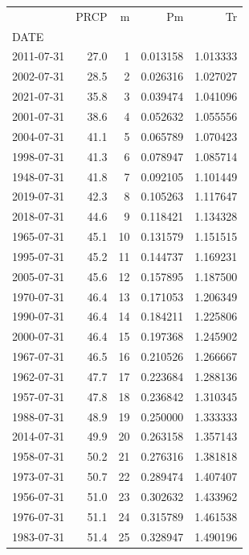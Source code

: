 \documentclass[
  letterpaper,
  DIV=11,
  numbers=noendperiod]{scrreprt}
\begin{document}
\begin{tabular}{lrrrr}
\toprule
{} &   PRCP &   m &        Pm &         Tr \\
DATE       &        &     &           &            \\
\midrule
2011-07-31 &   27.0 &   1 &  0.013158 &   1.013333 \\
2002-07-31 &   28.5 &   2 &  0.026316 &   1.027027 \\
2021-07-31 &   35.8 &   3 &  0.039474 &   1.041096 \\
2001-07-31 &   38.6 &   4 &  0.052632 &   1.055556 \\
2004-07-31 &   41.1 &   5 &  0.065789 &   1.070423 \\
1998-07-31 &   41.3 &   6 &  0.078947 &   1.085714 \\
1948-07-31 &   41.8 &   7 &  0.092105 &   1.101449 \\
2019-07-31 &   42.3 &   8 &  0.105263 &   1.117647 \\
2018-07-31 &   44.6 &   9 &  0.118421 &   1.134328 \\
1965-07-31 &   45.1 &  10 &  0.131579 &   1.151515 \\
1995-07-31 &   45.2 &  11 &  0.144737 &   1.169231 \\
2005-07-31 &   45.6 &  12 &  0.157895 &   1.187500 \\
1970-07-31 &   46.4 &  13 &  0.171053 &   1.206349 \\
1990-07-31 &   46.4 &  14 &  0.184211 &   1.225806 \\
2000-07-31 &   46.4 &  15 &  0.197368 &   1.245902 \\
1967-07-31 &   46.5 &  16 &  0.210526 &   1.266667 \\
1962-07-31 &   47.7 &  17 &  0.223684 &   1.288136 \\
1957-07-31 &   47.8 &  18 &  0.236842 &   1.310345 \\
1988-07-31 &   48.9 &  19 &  0.250000 &   1.333333 \\
2014-07-31 &   49.9 &  20 &  0.263158 &   1.357143 \\
1958-07-31 &   50.2 &  21 &  0.276316 &   1.381818 \\
1973-07-31 &   50.7 &  22 &  0.289474 &   1.407407 \\
1956-07-31 &   51.0 &  23 &  0.302632 &   1.433962 \\
1976-07-31 &   51.1 &  24 &  0.315789 &   1.461538 \\
1983-07-31 &   51.4 &  25 &  0.328947 &   1.490196 \\

\end{tabular}
\end{document}
